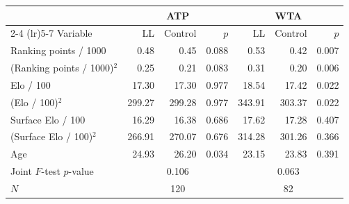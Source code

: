 \begin{tabular}{l rrr rrr}
\toprule
 & \multicolumn{3}{c}{ATP} & \multicolumn{3}{c}{WTA} \\
\cmidrule(lr){2-4} \cmidrule(lr){5-7}
Variable & LL & Control & $p$ & LL & Control & $p$ \\
\midrule
Ranking points / 1000 & 0.48 & 0.45 & 0.088 & 0.53 & 0.42 & 0.007 \\
(Ranking points / 1000)$^2$ & 0.25 & 0.21 & 0.083 & 0.31 & 0.20 & 0.006 \\
Elo / 100 & 17.30 & 17.30 & 0.977 & 18.54 & 17.42 & 0.022 \\
(Elo / 100)$^2$ & 299.27 & 299.28 & 0.977 & 343.91 & 303.37 & 0.022 \\
Surface Elo / 100 & 16.29 & 16.38 & 0.686 & 17.62 & 17.28 & 0.407 \\
(Surface Elo / 100)$^2$ & 266.91 & 270.07 & 0.676 & 314.28 & 301.26 & 0.366 \\
Age & 24.93 & 26.20 & 0.034 & 23.15 & 23.83 & 0.391 \\
\midrule
Joint $F$-test $p$-value & \multicolumn{3}{c}{0.106} & \multicolumn{3}{c}{0.063} \\
$N$ & \multicolumn{3}{c}{120} & \multicolumn{3}{c}{82} \\
\bottomrule
\end{tabular}
